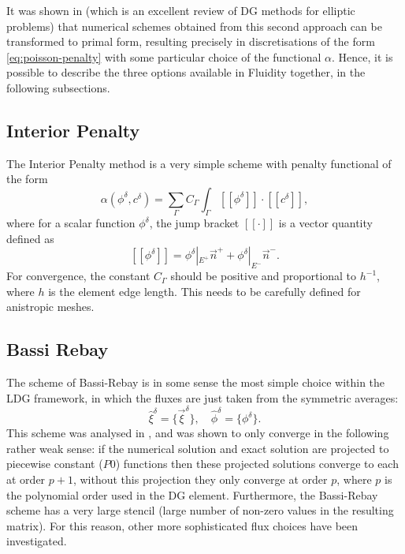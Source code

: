 It was shown in \citet{arnold2002} (which is an excellent review of DG
methods for elliptic problems) that numerical schemes obtained from
this second approach can be transformed to primal form, resulting
precisely in discretisations of the form \eqref{eq:poisson-penalty}
with some particular choice of the functional $\alpha$. Hence, it is
possible to describe the three options available in Fluidity together,
in the following subsections.

\subsection{Interior Penalty}
The Interior Penalty method is a very simple scheme with penalty
functional of the form
\begin{equation}
\label{eq:ip}
\alpha(\phi^\delta,c^\delta) = \sum_{\Gamma}C_{\Gamma}\int_{\Gamma}
[[\phi^\delta]]\cdot[[c^\delta]],
\end{equation}
where for a scalar function $\phi^\delta$, the jump bracket
$[[\cdot]]$ is a vector quantity defined as
\[
[[\phi^\delta]] = \phi^\delta|_{E^+}\vec{n}^+ + \phi^\delta|_{E^-}\vec{n}^-.
\]
For convergence, the constant $C_{\Gamma}$ should be positive and
proportional to $h^{-1}$, where $h$ is the element edge length. This 
needs to be carefully defined for anistropic meshes.

\subsection{Bassi Rebay}
\label{BassiRebay}
The scheme of Bassi-Rebay \citep{bassi1997} is in some sense the most
simple choice within the LDG framework, in which the fluxes are just
taken from the symmetric averages:
\[
\hat{\xi}^\delta = \{\vec{\xi}^\delta\}, \quad
\hat{\phi}^\delta = \{\phi^\delta\}.
\]
This scheme was analysed in \cite{arnold2002}, and was shown to only
converge in the following rather weak sense: if the numerical solution
and exact solution are projected to piecewise constant
($P0$) functions then these projected solutions converge to each at order $p+1$,
without this projection they only converge at order $p$, where $p$ is
the polynomial order used in the DG element. Furthermore, the
Bassi-Rebay scheme has a very large stencil (large number of non-zero
values in the resulting matrix). For this reason, other more
sophisticated flux choices have been investigated.

